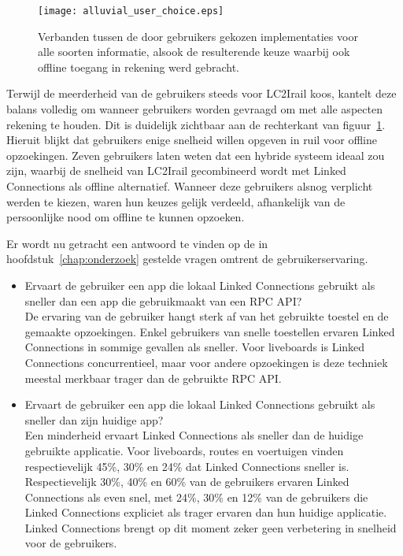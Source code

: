 \begin{figure}[ht]
	\centering
	\texttt{[image: alluvial\_user\_choice.eps]}
	\caption[Door gebruikers gekozen implementatie]{Verbanden tussen de door gebruikers gekozen implementaties voor alle soorten informatie, alsook de resulterende keuze waarbij ook offline toegang in rekening werd gebracht. }
	\label{fig:alluvialUserChoices}
\end{figure}

Terwijl de meerderheid van de gebruikers steeds voor LC2Irail koos, kantelt deze balans volledig om wanneer gebruikers worden gevraagd om met alle aspecten rekening te houden. Dit is duidelijk zichtbaar aan de rechterkant van figuur~\ref{fig:alluvialUserChoices}. Hieruit blijkt dat gebruikers enige snelheid willen opgeven in ruil voor offline opzoekingen. Zeven gebruikers laten weten dat een hybride systeem ideaal zou zijn, waarbij de snelheid van LC2Irail gecombineerd wordt met Linked Connections als offline alternatief. Wanneer deze gebruikers alsnog verplicht werden te kiezen, waren hun keuzes gelijk verdeeld, afhankelijk van de persoonlijke nood om offline te kunnen opzoeken. 

Er wordt nu getracht een antwoord te vinden op de in hoofdstuk~\ref{chap:onderzoek} gestelde vragen omtrent de gebruikerservaring.
\begin{itemize}
	\item Ervaart de gebruiker een app die lokaal Linked Connections gebruikt als sneller dan een app die gebruikmaakt van een RPC API?\\
	De ervaring van de gebruiker hangt sterk af van het gebruikte toestel en de gemaakte opzoekingen. Enkel gebruikers van snelle toestellen ervaren Linked Connections in sommige gevallen als sneller. Voor liveboards is Linked Connections concurrentieel, maar voor andere opzoekingen is deze techniek meestal merkbaar trager dan de gebruikte RPC API.
	\item Ervaart de gebruiker een app die lokaal Linked Connections gebruikt als sneller dan zijn huidige app?\\
	Een minderheid ervaart Linked Connections als sneller dan de huidige gebruikte applicatie. Voor liveboards, routes en voertuigen vinden respectievelijk 45\%, 30\% en 24\% dat Linked Connections sneller is. Respectievelijk 30\%, 40\% en 60\% van de gebruikers ervaren Linked Connections als even snel, met 24\%, 30\% en 12\% van de gebruikers die Linked Connections expliciet als trager ervaren dan hun huidige applicatie. Linked Connections brengt op dit moment zeker geen verbetering in snelheid voor de gebruikers.
\end{itemize}

